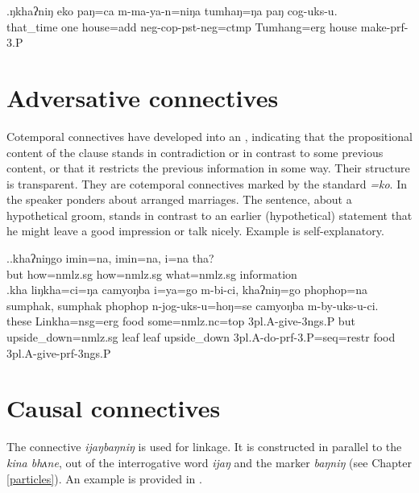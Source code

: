 \exg.ŋkhaʔniŋ eko paŋ=ca         m-ma-ya-n=niŋa tumhaŋ=ŋa   paŋ  cog-uks-u.\\
that\_time one house{\sc =add} {\sc neg-cop-pst-neg=ctmp} Tumhang{\sc =erg} house make{\sc -prf-3.P}\\
 


\section{Adversative connectives}

Cotemporal connectives have developed into an , indicating that the propositional content of the clause stands in contradiction or in contrast to some previous content, or that it restricts the previous information in some way. Their structure is transparent. They are cotemporal connectives marked by the standard  \emph{=ko}. In \Next[a] the speaker ponders about arranged marriages. The sentence, about  a hypothetical groom, stands in contrast to an earlier (hypothetical) statement that he might leave a good impression or talk nicely. Example  \Next[b] is self-explanatory.

\ex.\ag.khaʔniŋgo imin=na,       imin=na,       i=na           tha?\\
but how{\sc =nmlz.sg} how{\sc =nmlz.sg} what{\sc =nmlz.sg} information\\
  
\bg.kha liŋkha=ci=ŋa camyoŋba i=ya=go m-bi-ci, khaʔniŋ=go phophop=na sumphak, sumphak phophop n-jog-uks-u=hoŋ=se camyoŋba m-by-uks-u-ci.\\
these Linkha{\sc =nsg=erg} food some{\sc =nmlz.nc=top} {\sc 3pl.A-}give{\sc -3ngs.P} but upside\_down{\sc =nmlz.sg} leaf leaf upside\_down  {\sc 3pl.A-}do{\sc -prf-3.P=seq=restr} food {\sc 3pl.A-}give{\sc -prf-3ngs.P}\\
 

\section{Causal connectives}

The connective \emph{ijaŋbaŋniŋ}  is used for  linkage. It is constructed in parallel to the  \emph{kina bhʌne}, out of the interrogative word \emph{ijaŋ}  and the  marker \emph{baŋniŋ} (see Chapter \ref{particles}). An example is provided in \Next.

